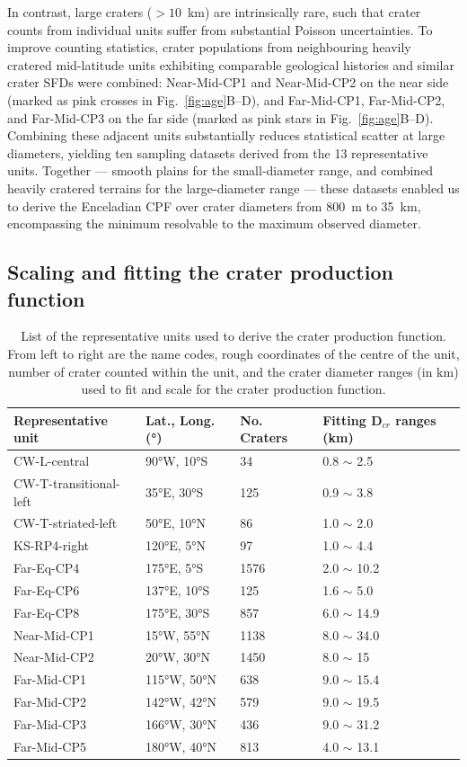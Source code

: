 \documentclass[preprint,11pt,3p,times,authoryear]{elsarticle}
\begin{document}
In contrast, large craters ($>10$~km) are intrinsically rare, such that crater counts from individual units suffer from substantial Poisson uncertainties. To improve counting statistics, crater populations from neighbouring heavily cratered mid-latitude units exhibiting comparable geological histories and similar crater SFDs were combined: Near-Mid-CP1 and Near-Mid-CP2 on the near side (marked as pink crosses in Fig.~\ref{fig:age}B--D), and Far-Mid-CP1, Far-Mid-CP2, and Far-Mid-CP3 on the far side (marked as pink stars in Fig.~\ref{fig:age}B--D). 
Combining these adjacent units substantially reduces statistical scatter at large diameters, yielding ten sampling datasets derived from the 13 representative units. 
Together — smooth plains for the small-diameter range, and combined heavily cratered terrains for the large-diameter range — these datasets enabled us to derive the Enceladian CPF over crater diameters from 800~m to 35~km, encompassing the minimum resolvable to the maximum observed diameter.

\subsection{Scaling and fitting the crater production function}
\begin{table}[t]
\centering
    \begin{tabular}{p{4.0cm} p{3.0cm} p{2.0cm} p{3.0cm}}
\hline
\textbf{Representative unit} & \textbf{Lat., Long. (°)} & \textbf{No. Craters} & \textbf{Fitting D$_{cr}$ ranges (km)} \\
\hline
CW-L-central & 90°W, 10°S & 34 & 0.8 $\sim$ 2.5 \\
CW-T-transitional-left & 35°E, 30°S & 125 & 0.9 $\sim$ 3.8 \\
CW-T-striated-left & 50°E, 10°N & 86 & 1.0 $\sim$ 2.0 \\
KS-RP4-right & 120°E, 5°N & 97 & 1.0 $\sim$ 4.4 \\
Far-Eq-CP4 & 175°E, 5°S & 1576 & 2.0 $\sim$ 10.2\\
Far-Eq-CP6 & 137°E, 10°S & 125 & 1.6 $\sim$ 5.0 \\
Far-Eq-CP8 & 175°E, 30°S & 857 & 6.0 $\sim$ 14.9 \\
Near-Mid-CP1 & 15°W, 55°N & 1138 & 8.0 $\sim$ 34.0 \\
Near-Mid-CP2 & 20°W, 30°N & 1450 & 8.0 $\sim$ 15 \\
Far-Mid-CP1 & 115°W, 50°N & 638 & 9.0 $\sim$ 15.4 \\
Far-Mid-CP2 & 142°W, 42°N & 579 & 9.0 $\sim$ 19.5 \\
Far-Mid-CP3 & 166°W, 30°N & 436 & 9.0 $\sim$ 31.2 \\
Far-Mid-CP5 & 180°W, 40°N & 813 & 4.0 $\sim$ 13.1 \\
\hline
\end{tabular}
\caption{List of the representative units used to derive the crater production function. From left to right are the name codes, rough coordinates of the centre of the unit, number of crater counted within the unit, and the crater diameter ranges (in km) used to fit and scale for the crater production function.}
\label{tab:representative_units}
\end{table}
\end{document}
